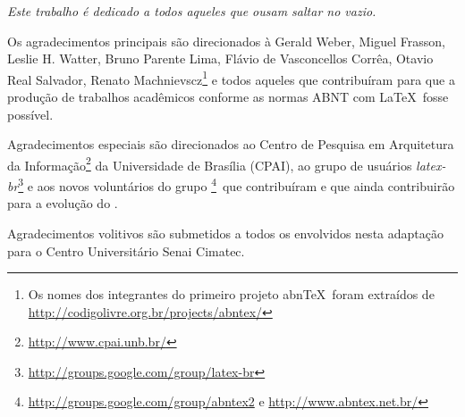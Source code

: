 \documentclass[
	12pt,				%
	openright,			%
	twoside,			%
	a4paper,			%
	english,			%
	french,				%
	spanish,			%
	brazil				%
	]{senai-cimatec-abntex2}
\begin{document}



\begin{dedicatoria}
	\vspace*{\fill}
	\centering
	\noindent
	\textit{ Este trabalho é dedicado a todos aqueles que ousam saltar no vazio.} \vspace*{\fill}
\end{dedicatoria}
\begin{agradecimentos}
	Os agradecimentos principais são direcionados à Gerald Weber, Miguel Frasson, Leslie H. Watter, Bruno Parente Lima, Flávio de Vasconcellos Corrêa, Otavio Real Salvador, Renato Machnievscz\footnote{Os nomes dos integrantes do primeiro projeto abn\TeX\ foram extraídos de \url{http://codigolivre.org.br/projects/abntex/}} e todos aqueles que contribuíram para que a produção de trabalhos acadêmicos conforme as normas ABNT com \LaTeX\ fosse possível.

	Agradecimentos especiais são direcionados ao Centro de Pesquisa em Arquitetura
	da Informação\footnote{\url{http://www.cpai.unb.br/}} da Universidade de
	Brasília (CPAI), ao grupo de usuários
	\emph{latex-br}\footnote{\url{http://groups.google.com/group/latex-br}} e aos
	novos voluntários do grupo
	\emph{\abnTeX}\footnote{\url{http://groups.google.com/group/abntex2} e
		\url{http://www.abntex.net.br/}}~que contribuíram e que ainda
	contribuirão para a evolução do \abnTeX.

	Agradecimentos volitivos são submetidos a todos os envolvidos nesta adaptação para o Centro Universitário Senai Cimatec.

\end{agradecimentos}
\end{document}
